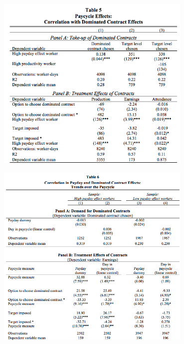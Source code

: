 \documentclass[a4paper,12pt]{article}
\begin{document}
\begin{table}[h]
\centering
\includegraphics[width=0.7\textwidth]{Table5.png}
\caption{\label{fig:Table5}}
\end{table}
\begin{table}[h]
\centering
\includegraphics[width=0.7\textwidth]{Table6.png}
\caption{\label{fig:Table6}}
\end{table}
\newpage
\end{document}
